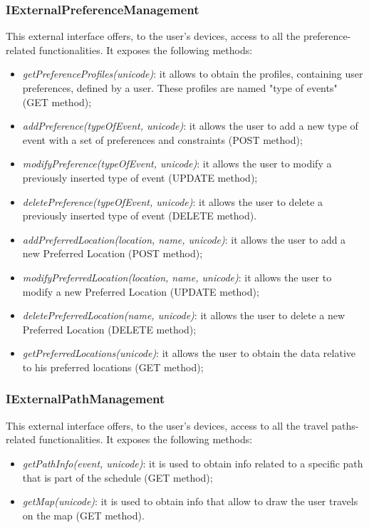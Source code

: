 \subsubsection{IExternalPreferenceManagement}
This external interface offers, to the user's devices, access to all the preference-related functionalities. It exposes the following methods:
\begin{itemize}
\item \textit{getPreferenceProfiles(unicode)}: it allows to obtain the profiles, containing user preferences, defined by a user. These profiles are named "type of events" (GET method);
\item \textit{addPreference(typeOfEvent, unicode)}: it allows the user to add a new type of event with a set of preferences and constraints (POST method);
\item \textit{modifyPreference(typeOfEvent, unicode)}: it allows the user to modify a previously inserted type of event (UPDATE method);
\item \textit{deletePreference(typeOfEvent, unicode)}: it allows the user to delete a previously inserted type of event (DELETE method).
\item \textit{addPreferredLocation(location, name, unicode)}: it allows the user to add a new Preferred Location (POST method);
\item \textit{modifyPreferredLocation(location, name, unicode)}: it allows the user to modify a new Preferred Location (UPDATE method);
\item \textit{deletePreferredLocation(name, unicode)}: it allows the user to delete a new Preferred Location (DELETE method);
\item \textit{getPreferredLocations(unicode)}: it allows the user to obtain the data relative to his preferred locations (GET method);
\end{itemize}
\subsubsection{IExternalPathManagement}
This external interface offers, to the user's devices, access to all the travel paths-related functionalities. It exposes the following methods:
\begin{itemize}
\item \textit{getPathInfo(event, unicode)}: it is used to obtain info related to a specific path that is part of the schedule (GET method);
\item \textit{getMap(unicode)}: it is used to obtain info that allow to draw the user travels on the map (GET method).
\end{itemize}


